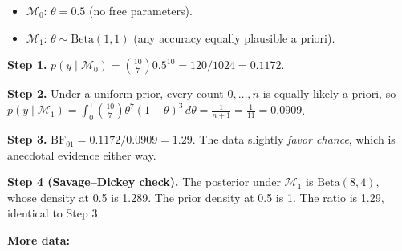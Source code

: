 \begin{itemize}
\tightlist
\item
  \(\mathcal{M}_0\): \(\theta = 0.5\) (no free parameters).
\item
  \(\mathcal{M}_1\): \(\theta \sim \mathrm{Beta}(1, 1)\) (any accuracy
  equally plausible a priori).
\end{itemize}

\textbf{Step 1.}
\(p(y\mid\mathcal{M}_0) = \binom{10}{7} 0.5^{10} = 120/1024 = 0.1172\).

\textbf{Step 2.} Under a uniform prior, every count \(0, \dots, n\) is
equally likely a priori, so
\(p(y\mid\mathcal{M}_1) = \int_0^1 \binom{10}{7}\theta^7(1-\theta)^3\, d\theta = \frac{1}{n+1} = \frac{1}{11} = 0.0909\).

\textbf{Step 3.} \(\mathrm{BF}_{01} = 0.1172 / 0.0909 = 1.29\). The data
slightly \emph{favor chance}, which is anecdotal evidence either way.

\textbf{Step 4 (Savage--Dickey check).} The posterior under
\(\mathcal{M}_1\) is \(\mathrm{Beta}(8, 4)\), whose density at 0.5 is
1.289. The prior density at 0.5 is 1. The ratio is 1.29, identical to
Step 3.

\textbf{More data:}

